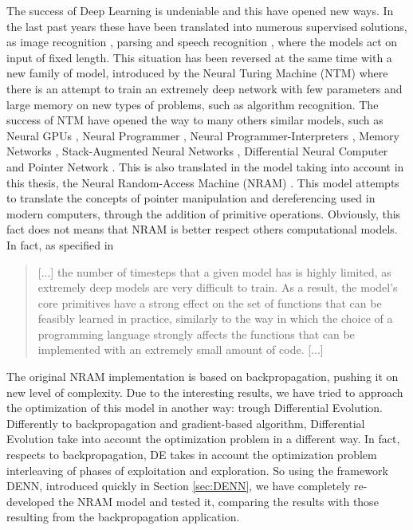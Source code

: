 The success of Deep Learning is undeniable and this have opened new ways. In the last past years these have been translated into numerous supervised solutions, as image recognition \cite{Krizhevsky2012ImageNetCW}, parsing \cite{Vinyals2015GrammarAA} and speech recognition \cite{Chan2015ListenAA}, where the models act on input of fixed length. This situation has been reversed at the same time with a new family of model, introduced by the Neural Turing Machine (NTM) \cite{Graves2014NeuralTM} where there is an attempt to train an extremely deep network with few parameters and large memory on new types of problems, such as algorithm recognition. The success of NTM have opened the way to many others similar models, such as Neural GPUs \cite{Kaiser2015NeuralGL}, Neural Programmer \cite{Neelakantan2015NeuralPI}, Neural Programmer-Interpreters \cite{Reed2015NeuralP}, Memory Networks \cite{Weston2014MemoryN}, Stack-Augmented Neural Networks \cite{Joulin2015InferringAP}, Differential Neural Computer \cite{Graves2016HybridCU} and Pointer Network \cite{Vinyals2015PointerN}.
\newline \newline
This is also translated in the model taking into account in this thesis, the Neural Random-Access Machine (NRAM) \cite{NRAM:2016}. This model attempts to translate the concepts of pointer manipulation and dereferencing used in modern computers, through the addition of primitive operations. Obviously, this fact does not means that NRAM is better respect others computational models. In fact, as specified in \cite{NRAM:2016}
\begin{quote}
[...] the number of timesteps that a given model has is highly limited, as extremely deep models are very difficult to train. As a result, the model’s core primitives have a strong effect on the set of functions that can be feasibly learned in practice, similarly to the way in which the choice of a programming language strongly affects the functions that can be implemented with an extremely small amount of code. [...]
\end{quote}

The original NRAM implementation is based on backpropagation, pushing it on new level of complexity. Due to the interesting results, we have tried to approach the optimization of this model in another way: trough Differential Evolution. Differently to backpropagation and gradient-based algorithm, Differential Evolution take into account the optimization problem in a different way. In fact, respects to backpropagation, DE takes in account the optimization problem interleaving of phases of exploitation and exploration. So using the framework DENN, introduced quickly in Section \ref{sec:DENN}, we have completely re-developed the NRAM model and tested it, comparing the results with those resulting from the backpropagation application.